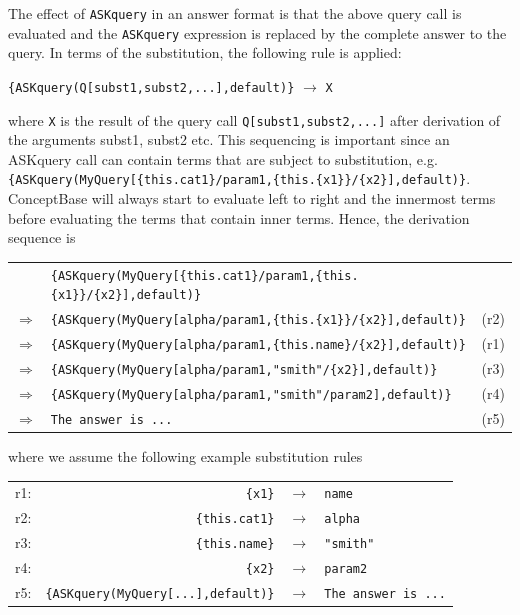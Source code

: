 The effect of {\tt ASKquery} in an answer format is that the above query call is evaluated
and the {\tt ASKquery} expression is replaced by the complete answer to the query.
In terms of the substitution, the following rule is applied:

   \verb+{ASKquery(Q[subst1,subst2,...],default)}+ $\longrightarrow$ {\tt X}

where {\tt X} is the result of the query call \verb+Q[subst1,subst2,...]+ after derivation of the arguments subst1, subst2 etc. This sequencing is important since
an ASKquery call can contain terms that are subject to substitution, e.g.\
\newline
\verb+{ASKquery(MyQuery[{this.cat1}/param1,{this.{x1}}/{x2}],default)}+.
\newline
ConceptBase will always start to evaluate left to right and the
innermost terms before evaluating the terms that contain inner terms. Hence, the derivation sequence is

{\small
\begin{tabular}{rll}
   & \verb+{ASKquery(MyQuery[{this.cat1}/param1,{this.{x1}}/{x2}],default)}+ & \\
 $\Longrightarrow$ & \verb+{ASKquery(MyQuery[alpha/param1,{this.{x1}}/{x2}],default)}+ & (r2)\\
 $\Longrightarrow$ & \verb+{ASKquery(MyQuery[alpha/param1,{this.name}/{x2}],default)}+ & (r1)\\
 $\Longrightarrow$ & \verb+{ASKquery(MyQuery[alpha/param1,"smith"/{x2}],default)}+     & (r3)\\
 $\Longrightarrow$ & \verb+{ASKquery(MyQuery[alpha/param1,"smith"/param2],default)}+   & (r4)\\
 $\Longrightarrow$ & \verb+The answer is ...+                                        & (r5)\\
\end{tabular}
}

where we assume the following example substitution rules

\begin{tabular}{lrcl}
r1: & \verb+{x1}+ & $\longrightarrow$ & {\tt name} \\
r2: & \verb+{this.cat1}+ & $\longrightarrow$ & {\tt alpha} \\
r3: & \verb+{this.name}+ & $\longrightarrow$ & \verb+"smith"+ \\
r4: & \verb+{x2}+ & $\longrightarrow$ & {\tt param2} \\
r5:  & \verb+{ASKquery(MyQuery[...],default)}+ & $\longrightarrow$ & {\tt The answer is ...}\\
\end{tabular}

